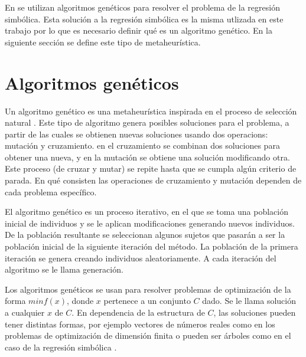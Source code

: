 
En \cite{koza1994genetic, iba2008inference, gaucel2014learning, kronberger2019identification} se utilizan algoritmos genéticos para resolver el problema de la regresión simbólica. Esta solución a la regresión simbólica es la misma utlizada en este trabajo por lo que es necesario definir qué es un algoritmo genético. En la siguiente sección se define este tipo de metaheurística.

\section{Algoritmos genéticos}\label{section:genetic_algorithm}

Un algoritmo genético es una metaheurística inspirada en el proceso de selección natural \cite{mitchell1998introduction}. Este tipo de algoritmo genera posibles soluciones para el problema, a partir de las cuales se obtienen nuevas soluciones usando dos operacions: mutación y cruzamiento. en el cruzamiento se combinan dos soluciones para obtener una nueva, y en la mutación se obtiene una solución modificando otra. Este proceso (de cruzar y mutar) se repite hasta que se cumpla algún criterio de parada. En qué consisten las operaciones de cruzamiento y mutación dependen de cada problema específico.

El algoritmo genético es un proceso iterativo, en el que se toma una población inicial de individuos y se le aplican modificaciones generando nuevos individuos. De la población resultante se seleccionan algunos sujetos que pasarán a ser la población inicial de la siguiente iteración del método. La población de la primera iteración se genera creando individuos aleatoriamente. A cada iteración del algoritmo se le llama generación.

Los algoritmos genéticos se usan para resolver problemas de optimización de la forma $min f(x)$, donde $x$ pertenece a un conjunto $C$ dado. Se le llama solución a cualquier $x$ de $C$. En dependencia de la estructura de $C$, las soluciones pueden tener distintas formas, por ejemplo vectores de números reales como en los problemas de optimización de dimensión finita \cite{mitchell1998introduction} o pueden ser árboles como en el caso de la regresión simbólica \cite{mitchell1998introduction}.

